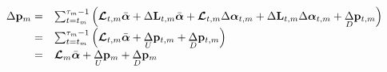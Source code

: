 \documentclass[12pt]{article}
\providecommand{\DIFaddbegin}{} %
\providecommand{\DIFaddend}{} %
\providecommand{\DIFdelbegin}{} %
\providecommand{\DIFdelend}{} %
\newcommand{\DIFscaledelfig}{0.5}
\newlength{\DIFdelgraphicswidth} %
\newlength{\DIFdelgraphicsheight} %
\newcommand{\DIFaddincludegraphics}[2][]{{\color{blue}\fbox{\DIFOincludegraphics[#1]{#2}}}} %
\newcommand{\DIFdelincludegraphics}[2][]{%
\sbox{\DIFdelgraphicsbox}{\DIFOincludegraphics[#1]{#2}}%
\settoboxwidth{\DIFdelgraphicswidth}{\DIFdelgraphicsbox} %
\settoboxtotalheight{\DIFdelgraphicsheight}{\DIFdelgraphicsbox} %
\scalebox{\DIFscaledelfig}{%
\parbox[b]{\DIFdelgraphicswidth}{\usebox{\DIFdelgraphicsbox}\\[-\baselineskip] \rule{\DIFdelgraphicswidth}{0em}}\llap{\resizebox{\DIFdelgraphicswidth}{\DIFdelgraphicsheight}{%
\setlength{\unitlength}{\DIFdelgraphicswidth}%
\begin{picture}(1,1)%
\thicklines\linethickness{2pt} %
{\color[rgb]{1,0,0}\put(0,0){\framebox(1,1){}}}%
{\color[rgb]{1,0,0}\put(0,0){\line( 1,1){1}}}%
{\color[rgb]{1,0,0}\put(0,1){\line(1,-1){1}}}%
\end{picture}%
}\hspace*{3pt}}} %
} %
\DeclareRobustCommand{\DIFaddbegin}{\DIFOaddbegin \let\includegraphics\DIFaddincludegraphics} %
\DeclareRobustCommand{\DIFaddend}{\DIFOaddend \let\includegraphics\DIFOincludegraphics} %
\DeclareRobustCommand{\DIFdelbegin}{\DIFOdelbegin \let\includegraphics\DIFdelincludegraphics} %
\DeclareRobustCommand{\DIFdelend}{\DIFOaddend \let\includegraphics\DIFOincludegraphics} %
\begin{document}
\begin{bibunit}
\begin{equation}
\DIFdelbegin %
\DIFdelend \DIFaddbegin \begin{array}{rl}
\Delta {\bf p}_m
=& \sum_{t=t_m}^{\tau_m-1} \left(\boldsymbol{\mathcal{L}}_{t,m}\bar{\boldsymbol{\alpha}}+\Delta{\bf L}_{t,m}\bar{\boldsymbol{\alpha}}+\boldsymbol{\mathcal{L}}_{t,m}\Delta\boldsymbol{\alpha}_{t,m}+\Delta{\bf L}_{t,m}\Delta\boldsymbol{\alpha}_{t,m}+\underset{D}\Delta {\bf p}_{t, m}\right)\\
=& \sum_{t=t_m}^{\tau_m-1} \left(\boldsymbol{\mathcal{L}}_{t,m}\bar{\boldsymbol{\alpha}}+\underset{U}\Delta {\bf p}_{t, m}+\underset{D}\Delta {\bf p}_{t, m}\right)\\
=&\boldsymbol{\mathcal{L}}_{m}\bar{\boldsymbol{\alpha}}+\underset{U}\Delta {\bf p}_{m}+\underset{D}\Delta {\bf p}_{m}\\
\end{array}\DIFaddend 
\label{Eq:dp}
\end{equation}


\end{bibunit}
\end{document}
